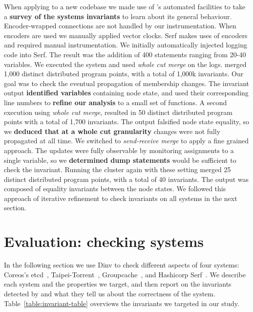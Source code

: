 When applying \dinv to a new codebase we made use of \dinv's automated
facilities to take a \textbf{survey of the systems invariants} to
learn about its general behaviour. Encoder-wrapped connections are not
handled by our instrumentation. When encoders are used we manually
applied vector clocks. Serf makes uses of encoders and required manual
instrumentation. We initially automatically injected logging code into
Serf. The result was the addition of 400 statements ranging from 20-40
variables. We executed the system and used \emph{whole cut merge} on
the logs. \dinv merged 1,000 distinct distributed program points, with
a total of 1,000k invariants. Our goal was to check the eventual
propagation of membership changes. The invariant output
\textbf{identified variables} containing node state, and used their
corresponding line numbers to \textbf{refine our analysis} to a small
set of functions. A second execution using \emph{whole cut merge},
resulted in 50 distinct distributed program points with a total of
1,700 invariants. The output falsified node state equality, so we
\textbf{deduced that at a whole cut granularity} changes were not
fully propagated at all time. We switched to \emph{send-receive merge}
to apply a fine grained approach. The updates were fully observable by
monitoring assignments to a single variable, so we \textbf{determined
  dump statements} would be sufficient to check the invariant. Running
the cluster again with these setting merged 25 distinct distributed
program points, with a total of 40 invariants. The output was composed
of equality invariants between the node states. We followed this approach
of iterative refinement to check invariants on all systems in the next
section.

\section{Evaluation: checking systems}
\label{sec:eval-checking}

\label{sec:checking-systems}
In the following section we use Dinv to check different aspects of
four systems: Coreos's etcd~\cite{etcdraft},
Taipei-Torrent~\cite{taipeitorrent}, Groupcache~\cite{groupcache}, and
Hashicorp Serf~\cite{serf}. We describe each system and the properties
we target, and then report on the invariants detected by \dinv and
what they tell us about the correctness of the system.
Table~\ref{table:invariant-table} overviews the invariants we targeted
in our study.  %

